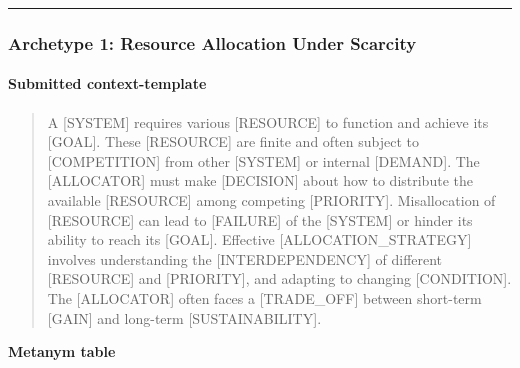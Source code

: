 \begin{center}\rule{0.5\linewidth}{0.5pt}\end{center}

\subsubsection{Archetype 1: Resource Allocation Under Scarcity}\label{archetype-1-resource-allocation-under-scarcity}

\paragraph{Submitted context-template}\label{submitted-context-template}

\begin{quote}
A {[}SYSTEM{]} requires various {[}RESOURCE{]} to function and achieve its {[}GOAL{]}. These {[}RESOURCE{]} are finite and often subject to {[}COMPETITION{]} from other {[}SYSTEM{]} or internal {[}DEMAND{]}. The {[}ALLOCATOR{]} must make {[}DECISION{]} about how to distribute the available {[}RESOURCE{]} among competing {[}PRIORITY{]}. Misallocation of {[}RESOURCE{]} can lead to {[}FAILURE{]} of the {[}SYSTEM{]} or hinder its ability to reach its {[}GOAL{]}. Effective {[}ALLOCATION\_STRATEGY{]} involves understanding the {[}INTERDEPENDENCY{]} of different {[}RESOURCE{]} and {[}PRIORITY{]}, and adapting to changing {[}CONDITION{]}. The {[}ALLOCATOR{]} often faces a {[}TRADE\_OFF{]} between short-term {[}GAIN{]} and long-term {[}SUSTAINABILITY{]}.
\end{quote}

\textbf{Metanym table}

\protect{}\label{tab-target-metanym}{}

